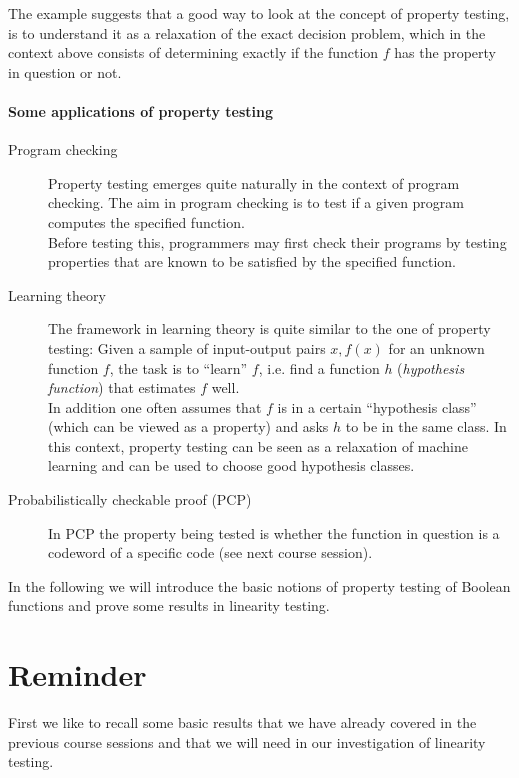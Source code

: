 \documentclass[a4paper]{article}
\theoremstyle{plain}
\theoremstyle{definition}
\theoremstyle{remark}
\begin{document}
\noindent The example suggests that a good way to look at the concept
of property testing, is to understand it as a relaxation of the exact
decision problem, which in the context above consists of determining
exactly if the function \(f\) has the property in question or not. 

\paragraph{Some applications of property testing}
\begin{description}
\item[Program checking] Property testing emerges quite naturally in
  the context of program checking. The aim in program checking is to
  test if a given program computes the specified function. \\
  Before testing this, programmers may first check their programs by
  testing properties that are known to be satisfied by the specified
  function.
\item[Learning theory] The framework in learning theory is quite
  similar to the one of property testing: Given a sample of
  input-output pairs \(x,f(x)\) for an unknown function \(f\), the task
  is to ``learn'' \(f\), i.e. find a function \(h\) (\emph{hypothesis
    function}) that estimates \(f\) well. \\
  In addition one often assumes that \(f\) is in a certain
  ``hypothesis class'' (which can be viewed as a property) and asks
  \(h\) to be in the same class. In this context, property testing can
  be seen as a relaxation of machine learning and can be used to
  choose good hypothesis classes.
\item[Probabilistically checkable proof (PCP)] In PCP the property
  being tested is whether the function in question is a codeword of a
  specific code (see next course session). 
\end{description}

\noindent In the following we will introduce the basic notions of property
testing of Boolean functions and prove some results in linearity
testing. 


\section{Reminder}
\label{sec:reminder}

First we like to recall some basic results that we have already
covered in the previous course sessions and that we will need in our
investigation of linearity testing. \\
\end{document}
